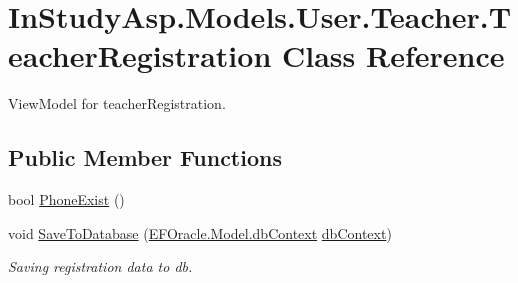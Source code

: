 \hypertarget{class_in_study_asp_1_1_models_1_1_user_1_1_teacher_1_1_teacher_registration}{}\section{In\+Study\+Asp.\+Models.\+User.\+Teacher.\+Teacher\+Registration Class Reference}
\label{class_in_study_asp_1_1_models_1_1_user_1_1_teacher_1_1_teacher_registration}


View\+Model for teacher\+Registration.  


\subsection*{Public Member Functions}
\begin{DoxyCompactItemize}
\item 
bool \hyperlink{class_in_study_asp_1_1_models_1_1_user_1_1_teacher_1_1_teacher_registration_aa32defbc6273f2a084d3ec9c1f5fec0a}{Phone\+Exist} ()
\item 
void \hyperlink{class_in_study_asp_1_1_models_1_1_user_1_1_teacher_1_1_teacher_registration_ad2db85099f5b797b8a9a3b304d5604fe}{Save\+To\+Database} (\hyperlink{class_e_f_oracle_1_1_model_1_1db_context}{E\+F\+Oracle.\+Model.\+db\+Context} \hyperlink{class_e_f_oracle_1_1_model_1_1db_context}{db\+Context})
\begin{DoxyCompactList}\small\item\em Saving registration data to db. \end{DoxyCompactList}\end{DoxyCompactItemize}
